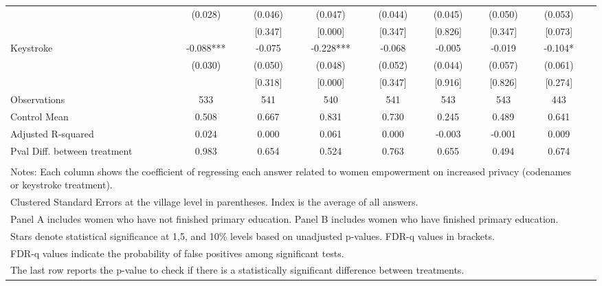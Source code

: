 \begin{tabular}{l*{8}{c}}
                    &     (0.028)   &     (0.046)   &     (0.047)   &     (0.044)   &     (0.045)   &     (0.050)   &     (0.053)   \\
                    &               &     [0.347]   &     [0.000]   &     [0.347]   &     [0.826]   &     [0.347]   &     [0.073]   \\
Keystroke           &      -0.088***&      -0.075   &      -0.228***&      -0.068   &      -0.005   &      -0.019   &      -0.104*  \\
                    &     (0.030)   &     (0.050)   &     (0.048)   &     (0.052)   &     (0.044)   &     (0.057)   &     (0.061)   \\
                    &               &     [0.318]   &     [0.000]   &     [0.347]   &     [0.916]   &     [0.826]   &     [0.274]   \\
\hline
Observations        &         533   &         541   &         540   &         541   &         543   &         543   &         443   \\
Control Mean        &       0.508   &       0.667   &       0.831   &       0.730   &       0.245   &       0.489   &       0.641   \\
Adjusted R-squared  &       0.024   &       0.000   &       0.061   &       0.000   &      -0.003   &      -0.001   &       0.009   \\
Pval Diff. between treatment&       0.983   &       0.654   &       0.524   &       0.763   &       0.655   &       0.494   &       0.674   \\
\hline \\  \multicolumn{8}{l}{\tiny Notes: Each column shows the coefficient of regressing each answer related to women empowerment
on increased privacy (codenames or keystroke treatment).} \\ \multicolumn{8}{l}{\tiny Clustered Standard Errors at the village level in parentheses. Index is the average of all answers.}\\  \multicolumn{8}{l}{\tiny Panel A includes women who have not finished primary education. Panel B includes women who have finished primary education. } \\ \multicolumn{8}{l}{\tiny Stars denote statistical significance at 1,5, and 10\% levels based on unadjusted p-values. FDR-q values in brackets.} \\ \multicolumn{8}{l}{\tiny FDR-q values indicate the probability of false positives among significant tests.} \\ \multicolumn{8}{l}{\tiny The last row reports the p-value to check if there is a statistically significant difference between treatments. } \\  \hline\hline \end{tabular}
